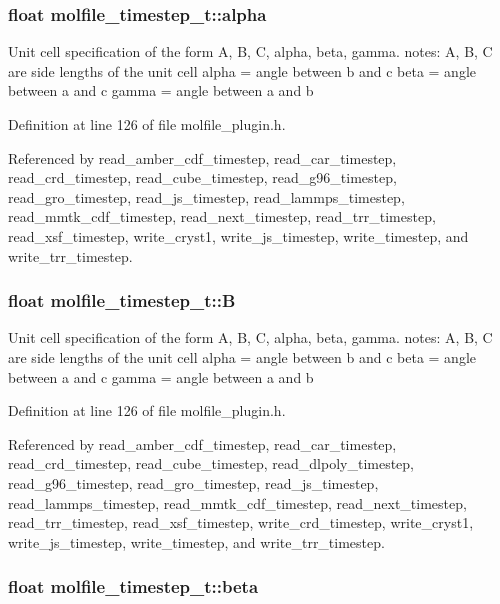 \subsubsection{\setlength{\rightskip}{0pt plus 5cm}float molfile\_\-timestep\_\-t::alpha}\label{structmolfile__timestep__t_z4_3}


Unit cell specification of the form A, B, C, alpha, beta, gamma. notes: A, B, C are side lengths of the unit cell alpha = angle between b and c beta = angle between a and c gamma = angle between a and b 

Definition at line 126 of file molfile\_\-plugin.h.

Referenced by read\_\-amber\_\-cdf\_\-timestep, read\_\-car\_\-timestep, read\_\-crd\_\-timestep, read\_\-cube\_\-timestep, read\_\-g96\_\-timestep, read\_\-gro\_\-timestep, read\_\-js\_\-timestep, read\_\-lammps\_\-timestep, read\_\-mmtk\_\-cdf\_\-timestep, read\_\-next\_\-timestep, read\_\-trr\_\-timestep, read\_\-xsf\_\-timestep, write\_\-cryst1, write\_\-js\_\-timestep, write\_\-timestep, and write\_\-trr\_\-timestep.
\subsubsection{\setlength{\rightskip}{0pt plus 5cm}float molfile\_\-timestep\_\-t::B}\label{structmolfile__timestep__t_z4_1}


Unit cell specification of the form A, B, C, alpha, beta, gamma. notes: A, B, C are side lengths of the unit cell alpha = angle between b and c beta = angle between a and c gamma = angle between a and b 

Definition at line 126 of file molfile\_\-plugin.h.

Referenced by read\_\-amber\_\-cdf\_\-timestep, read\_\-car\_\-timestep, read\_\-crd\_\-timestep, read\_\-cube\_\-timestep, read\_\-dlpoly\_\-timestep, read\_\-g96\_\-timestep, read\_\-gro\_\-timestep, read\_\-js\_\-timestep, read\_\-lammps\_\-timestep, read\_\-mmtk\_\-cdf\_\-timestep, read\_\-next\_\-timestep, read\_\-trr\_\-timestep, read\_\-xsf\_\-timestep, write\_\-crd\_\-timestep, write\_\-cryst1, write\_\-js\_\-timestep, write\_\-timestep, and write\_\-trr\_\-timestep.
\subsubsection{\setlength{\rightskip}{0pt plus 5cm}float molfile\_\-timestep\_\-t::beta}\label{structmolfile__timestep__t_z4_4}


